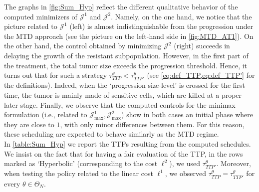 \documentclass[a4paper,12pt, reqno]{amsart}
\theoremstyle{plain}
\theoremstyle{definition}
\theoremstyle{remark}
\numberwithin{equation}{section}
\newcommand{\J}{\mathcal{J}}
\begin{document}
\noindent
The graphs in \cref{fig:Sum_Hyp} reflect the different qualitative behavior of the computed minimizers of $\J^1$ and $\J^2$.
Namely, on the one hand, we notice that the picture related to $\J^1$ (left) is almost indistinguishable from the {progression} under the MTD approach (see the picture on the left-hand side in \cref{fig:MTD_AT1}).
On the other hand, the control obtained by minimizing $\J^2$ (right) succeeds in delaying the growth of the resistant sub\-population. However, in the first part of the treatment, the total tumor size exceeds the progression threshold.
Hence, it turns out that for such a strategy $\tau_{TTP}^\theta < \tau_{TTP'}^\theta$ (see \cref{eq:def_TTP,eq:def_TTP'} for the definitions). 
Indeed, when the `progression size-level' is crossed for the first time, the tumor is mainly made of sensitive cells, which are killed at a proper later stage.
{Finally, we observe that the computed controls for the minimax formulation (i.e., related to $\J^1_{\max}, \J^2_{\max}$) show in both cases an initial phase where they are close to $1$, with only minor differences between them. For this reason, these scheduling are expected to behave similarly as the MTD regime.}\\
In \cref{table:Sum_Hyp} we report the TTPs resulting from the computed schedules. We insist on the fact that for having a fair evaluation of the TTP, in the rows marked as `Hyperbolic' (corresponding to the cost $\ell^2$), we used $\tau_{TTP'}^\theta$. 
Moreover, when testing the policy related to the linear cost $\ell^1$, we observed $\tau_{TTP}^\theta = \tau_{TTP'}^\theta$ for every $\theta\in \Theta_N$.
\end{document}
